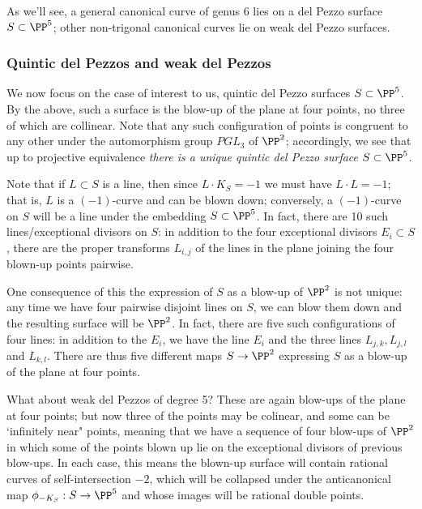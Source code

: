 As we'll see, a general canonical curve of genus 6 lies on a del Pezzo surface $S \subset \PP^5$;  other non-trigonal canonical curves  lie on weak del Pezzo surfaces. 

\subsubsection{Quintic del Pezzos and weak del Pezzos}

We now focus on the case of interest to us, quintic del Pezzo surfaces $S \subset \PP^5$. By the above, such a surface is the blow-up of the plane at four points, no three of which are collinear. Note that any such configuration of points is congruent to any other under the automorphism group $PGL_3$ of $\PP^2$; accordingly, we see that up to projective equivalence \emph{there is a unique quintic del Pezzo surface $S \subset \PP^5$}.

Note that if $L \subset S$ is a line, then since $L \cdot K_S = -1$ we must have $L\cdot L = -1$; that is, $L$ is a $(-1)$-curve and can be blown down; conversely, a $(-1)$-curve on $S$ will be a line under the embedding $S \subset \PP^5$. In fact, there are 10 such lines/exceptional divisors on $S$: in addition to the four exceptional divisors $E_i \subset S$, there are the proper transforms $L_{i,j}$ of the lines in the plane joining the four blown-up points pairwise.


One consequence of this the expression of $S$ as a blow-up of $\PP^2$ is not unique: any time we have four pairwise disjoint lines on $S$, we can blow them down and the resulting surface will be $\PP^2$. In fact, there are five such configurations of four lines: in addition to the $E_i$, we have the line $E_i$ and the three lines $L_{j,k}, L_{j,l}$ and $L_{k,l}$. There are thus five different maps $S \to \PP^2$ expressing $S$ as a blow-up of the plane at four points.

What about weak del Pezzos of degree 5? These are again blow-ups of the plane at four points; but now three of the points may be colinear, and some can be `infinitely near" points, meaning that we have a sequence of four blow-ups of $\PP^2$ in which some of the points blown up lie on the exceptional divisors of previous blow-ups. In each case, this means the blown-up surface will contain rational curves of self-intersection $-2$, which will be collapsed under the anticanonical map $\phi_{-K_S} : S \to \PP^5$ and whose images will be rational double points.

